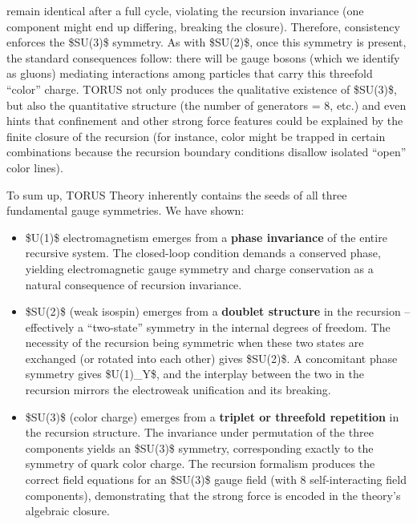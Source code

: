 \begin{itemize}
  remain identical after a full cycle, violating the recursion
  invariance (one component might end up differing, breaking the
  closure). Therefore, consistency enforces the \$SU(3)\$ symmetry​. As
  with \$SU(2)\$, once this symmetry is present, the standard
  consequences follow: there will be gauge bosons (which we identify as
  gluons) mediating interactions among particles that carry this
  threefold ``color'' charge. TORUS not only produces the qualitative
  existence of \$SU(3)\$, but also the quantitative structure (the
  number of generators = 8, etc.) and even hints that confinement and
  other strong force features could be explained by the finite closure
  of the recursion (for instance, color might be trapped in certain
  combinations because the recursion boundary conditions disallow
  isolated ``open'' color lines).
\end{itemize}

To sum up, TORUS Theory inherently contains the seeds of all three
fundamental gauge symmetries. We have shown:

\begin{itemize}
\item
  \$U(1)\$ electromagnetism emerges from a \textbf{phase invariance} of
  the entire recursive system. The closed-loop condition demands a
  conserved phase, yielding electromagnetic gauge symmetry and charge
  conservation as a natural consequence of recursion invariance.
\item
  \$SU(2)\$ (weak isospin) emerges from a \textbf{doublet structure} in
  the recursion -- effectively a ``two-state'' symmetry in the internal
  degrees of freedom​. The necessity of the recursion being symmetric
  when these two states are exchanged (or rotated into each other) gives
  \$SU(2)\$. A concomitant phase symmetry gives \$U(1)\_Y\$, and the
  interplay between the two in the recursion mirrors the electroweak
  unification and its breaking​.
\item
  \$SU(3)\$ (color charge) emerges from a \textbf{triplet or threefold
  repetition} in the recursion structure​. The invariance under
  permutation of the three components yields an \$SU(3)\$ symmetry,
  corresponding exactly to the symmetry of quark color charge. The
  recursion formalism produces the correct field equations for an
  \$SU(3)\$ gauge field (with 8 self-interacting field components),
  demonstrating that the strong force is encoded in the theory's
  algebraic closure​.
\end{itemize}

